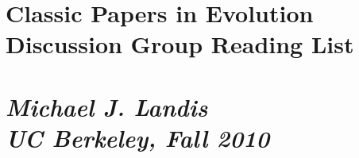
\section*{Classic Papers in Evolution\\Discussion Group Reading List}
\section*{{\it Michael J. Landis}\\{\it UC Berkeley, Fall 2010}}
\nocite{*}


